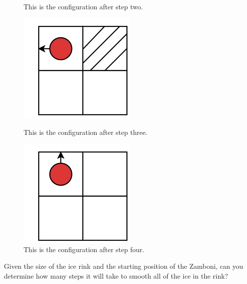 \documentclass[a4paper,11pt]{article}
\begin{document}
{\begin{figure}[!htb]
  \caption{This is the configuration after step two.}\label{fig:awesome_image3}
\endminipage
\end{figure}
\begin{figure}[!htb]
\center
{}
  \includegraphics[width=\linewidth]{step4pt1.png}
  \caption{This is the configuration after step three.}\label{fig:awesome_image2}
\endminipage\hfill
{}%
  \includegraphics[width=\linewidth]{step4end.png}
  \caption{This is the configuration after step four.}\label{fig:awesome_image3}
\endminipage
\end{figure}

\newpage
\noindent
Given the size of the ice rink and the starting position of the Zamboni, can you determine how many steps it will take to smooth all of the ice in the rink?
}
\end{document}
